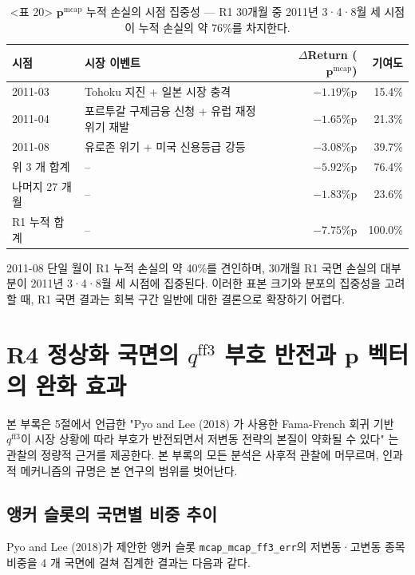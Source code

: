 \documentclass{article}
\begin{document}
\begin{table}[ht]
\centering
\caption{<표 20> $\mathbf{p}^{\mathrm{mcap}}$ 누적 손실의 시점 집중성 — R1 30개월 중
2011년 3·4·8월 세 시점이 누적 손실의 약 76\%를 차지한다.}
\label{tab:r1_loss_concentration}
\setlength{\tabcolsep}{8pt}
\renewcommand{\arraystretch}{1.2}
\small
\begin{tabular}{llrr}
\toprule
시점 & 시장 이벤트 & $\Delta$Return ($\mathbf{p}^{\mathrm{mcap}}$) & 기여도 \\
\midrule
2011-03 & Tohoku 지진 + 일본 시장 충격              & $-1.19$\%p & 15.4\% \\
2011-04 & 포르투갈 구제금융 신청 + 유럽 재정위기 재발 & $-1.65$\%p & 21.3\% \\
2011-08 & 유로존 위기 + 미국 신용등급 강등           & $-3.08$\%p & 39.7\% \\
\midrule
위 3 개 합계 & --                                  & $-5.92$\%p & 76.4\% \\
나머지 27 개월 & --                                & $-1.83$\%p & 23.6\% \\
\midrule
R1 누적 합계 & --                                  & $-7.75$\%p & 100.0\% \\
\bottomrule
\end{tabular}
\end{table}

2011-08 단일 월이 R1 누적 손실의 약 40\%를 견인하며, 30개월 R1 국면 손실의 대부분이 2011년 3·4·8월 세 시점에 집중된다. 이러한 표본 크기와 분포의 집중성을 고려할 때, R1 국면 결과는 회복 구간 일반에 대한 결론으로 확장하기 어렵다.

\section{R4 정상화 국면의 $q^{\mathrm{ff3}}$ 부호 반전과 $\mathbf{p}$ 벡터의 완화 효과}\label{app:r4_mechanism}

본 부록은 5절에서 언급한 "Pyo and Lee (2018) 가 사용한 Fama-French 회귀 기반 $q^{\mathrm{ff3}}$이 시장 상황에 따라 부호가 반전되면서 저변동 전략의 본질이 약화될 수 있다" 는 관찰의 정량적 근거를 제공한다. 본 부록의 모든 분석은 사후적 관찰에 머무르며, 인과적 메커니즘의 규명은 본 연구의 범위를 벗어난다.

\subsection{앵커 슬롯의 국면별 비중 추이}

Pyo and Lee (2018)가 제안한 앵커 슬롯 \texttt{mcap\_mcap\_ff3\_err}의 저변동·고변동 종목 비중을 4 개 국면에 걸쳐 집계한 결과는 다음과 같다.
\end{document}
